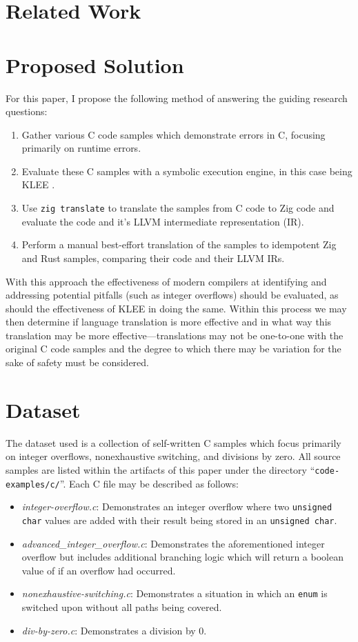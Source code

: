 \documentclass[conference]{IEEEtran}
\begin{document}
\section{Related Work}


\section{Proposed Solution}
For this paper, I propose the following method of answering the guiding research
questions:
\begin{enumerate}
    \item Gather various C code samples which demonstrate errors in C, focusing
        primarily on runtime errors.
    \item Evaluate these C samples with a symbolic execution engine, in this case
        being KLEE \cite{cadar2021klee}.
    \item Use \texttt{zig translate} to translate the samples from C code to Zig
        code and evaluate the code and it's LLVM intermediate representation (IR).
    \item Perform a manual best-effort translation of the samples to idempotent
        Zig and Rust samples, comparing their code and their LLVM IRs.
\end{enumerate}

With this approach the effectiveness of modern compilers at identifying and
addressing potential pitfalls (such as integer overflows) should be evaluated, as
should the effectiveness of KLEE in doing the same. Within this process we may then
determine if language translation is more effective and in what way this translation
may be more effective---translations may not be one-to-one with the original C code
samples and the degree to which there may be variation for the sake of safety must
be considered.


\section{Dataset}
The dataset used is a collection of self-written C samples which focus primarily on
integer overflows, nonexhaustive switching, and divisions by zero. All source samples
are listed within the artifacts of this paper under the directory
``\texttt{code-examples/c/}''. Each C file may be described as follows:
\begin{itemize}
    \item \textit{integer-overflow.c}: Demonstrates an integer overflow where two
        \texttt{unsigned char} values are added with their result being stored in an
        \texttt{unsigned char}.
    \item \textit{advanced\_integer\_overflow.c}: Demonstrates the aforementioned
        integer overflow but includes additional branching logic which will return a
        boolean value of if an overflow had occurred.
    \item \textit{nonexhaustive-switching.c}: Demonstrates a situation in which an
        \texttt{enum} is switched upon without all paths being covered.
    \item \textit{div-by-zero.c}: Demonstrates a division by 0.
\end{itemize}
\end{document}
